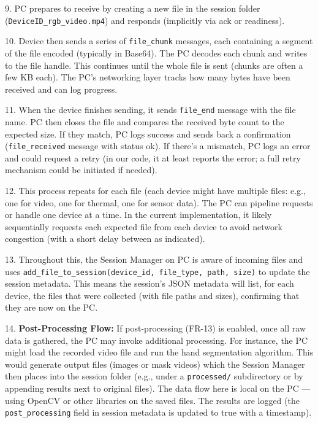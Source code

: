 9.  PC prepares to receive by creating a new file in the session folder
    (\texttt{DeviceID_rgb_video.mp4}) and responds (implicitly via ack or
    readiness).

10. Device then sends a series of \texttt{file_chunk} messages, each containing
    a segment of the file encoded (typically in
    Base64)\cite{DeviceServer}.
    The PC decodes each chunk and writes to the file
    handle\cite{DeviceServer}.
    This continues until the whole file is sent (chunks are often a few
    KB each). The PC's networking layer tracks how many bytes have been
    received and can log
    progress\cite{DeviceServer}.

11. When the device finishes sending, it sends \texttt{file_end} message with
    the file
    name\cite{DeviceServer}.
    PC then closes the file and compares the received byte count to the
    expected
    size\cite{DeviceServer}.
    If they match, PC logs success and sends back a confirmation
    (\texttt{file_received} message with status
    ok)\cite{DeviceServer}.
    If there's a mismatch, PC logs an error and could request a retry
    (in our code, it at least reports the error; a full retry mechanism
    could be initiated if needed).

12. This process repeats for each file (each device might have multiple
    files: e.g., one for video, one for thermal, one for sensor data).
    The PC can pipeline requests or handle one device at a time. In the
    current implementation, it likely sequentially requests each
    expected file from each
    device\cite{DeviceServer}
    to avoid network congestion (with a short delay between as
    indicated\cite{DeviceServer}).

13. Throughout this, the Session Manager on PC is aware of incoming
    files and uses
    \texttt{add_file_to_session(device_id, file_type, path, size)} to update
    the session
    metadata\cite{SessionManager}\cite{SessionManager}.
    This means the session's JSON metadata will list, for each device,
    the files that were collected (with file paths and sizes),
    confirming that they are now on the PC.

14. \textbf{Post-Processing Flow:} If post-processing (FR-13) is enabled,
    once all raw data is gathered, the PC may invoke additional
    processing. For instance, the PC might load the recorded video file
    and run the hand segmentation algorithm. This would generate output
    files (images or mask videos) which the Session Manager then places
    into the session folder (e.g., under a \texttt{processed/} subdirectory or
    by appending results next to original files). The data flow here is
    local on the PC --- using OpenCV or other libraries on the saved
    files. The results are logged (the \texttt{post_processing} field in
    session metadata is updated to true with a
    timestamp\cite{SessionManager}\cite{SessionManager}).

